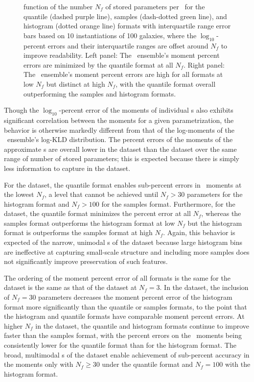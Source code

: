 \begin{figure}
\begin{center}
{			function of the number $N_{f}$ of stored parameters per \pz\ for the quantile 
			(dashed purple line), samples (dash-dotted green line), and histogram (dotted 
			orange line) formats with interquartile range error bars based on 10 
			instantiations of 100 galaxies, where the $\log_{10}$-percent errors and their 
			interquartile ranges are offset around $N_{f}$ to improve readability.
			Left panel: The \mgdata \pz\ ensemble's moment percent errors are minimized 
			by the quantile format at all $N_{f}$.
			Right panel: The \ssdata \pz\ ensemble's moment percent errors are high for 
			all formats at low $N_{f}$ but distinct at high $N_{f}$, with the quantile 
			format overall outperforming the samples and histogram formats.
			}
	\end{center}
\end{figure}

Though the $\log_{10}$-percent error of the moments of individual \pz s also 
exhibits significant correlation between the moments for a given 
parametrization, the behavior is otherwise markedly different from that of the 
log-moments of the \pz\ ensemble's log-KLD distribution.
The percent errors of the moments of the approximate \pz s are overall lower in 
the \mgdata dataset than the \ssdata dataset over the same range of number of 
stored parameters; this is expected because there is simply less information to 
capture in the \mgdata dataset.

For the \mgdata dataset, the quantile format enables sub-percent errors in \pz\ 
moments at the lowest $N_{f}$, a level that cannot be achieved until $N_{f}>30$ 
parameters for the histogram format and $N_{f}>100$ for the samples format.
Furthermore, for the \mgdata dataset, the quantile format minimizes the percent 
error at all $N_{f}$, whereas the samples format outperforms the histogram 
format at low $N_{f}$ but the histogram format is outperforms the samples 
format at high $N_{f}$.
Again, this behavior is expected of the narrow, unimodal \pz s of the \mgdata 
dataset because large histogram bins are ineffective at capturing small-scale 
structure and including more samples does not significantly improve 
preservation of such features.

The ordering of the moment percent error of all formats is the same for the 
\ssdata dataset is the same as that of the \mgdata dataset at $N_{f}=3$.
In the \ssdata dataset, the inclusion of $N_{f}=30$ parameters decreases the 
moment percent error of the histogram format more significantly than the 
quantile or samples formats, to the point that the histogram and quantile 
formats have comparable moment percent errors.
At higher $N_{f}$ in the \ssdata dataset, the quantile and histogram formats 
continue to improve faster than the samples format, with the percent errors on 
the \pz\ moments being consistently lower for the quantile format than for the 
histogram format.
The broad, multimodal \pz s of the \ssdata dataset enable achievement of 
sub-percent accuracy in the moments only with $N_{f}\geq30$ under the quantile 
format and $N_{f}=100$ with the histogram format.

